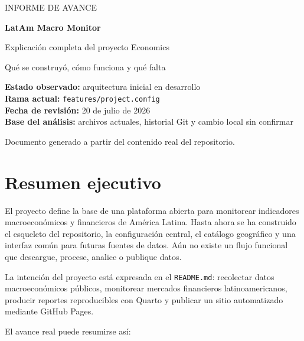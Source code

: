 \documentclass[11pt,a4paper]{article}
\newcommand{\code}[1]{\texttt{#1}}
\begin{document}
\begin{titlepage}
\pagecolor{navy}
\color{white}
\vspace*{2.2cm}
{\Large INFORME DE AVANCE\par}
\vspace{0.5cm}
{\fontsize{30}{36}\selectfont\bfseries LatAm Macro Monitor\par}
\vspace{0.4cm}
{\Large Explicación completa del proyecto Economics\par}
\vspace{1.4cm}
\color{white!85}
{\large Qué se construyó, cómo funciona y qué falta\par}
\vfill
\begin{tcolorbox}[colback=white,colframe=white!35,coltext=navy,boxrule=0.5pt,arc=2mm]
\textbf{Estado observado:} arquitectura inicial en desarrollo\\
\textbf{Rama actual:} \code{features/project.config}\\
\textbf{Fecha de revisión:} 20 de julio de 2026\\
\textbf{Base del análisis:} archivos actuales, historial Git y cambio local sin confirmar
\end{tcolorbox}
\vspace{1cm}
{\small Documento generado a partir del contenido real del repositorio.}
\end{titlepage}
\nopagecolor
\color{black}

\section{Resumen ejecutivo}

\begin{summarybox}
El proyecto define la base de una plataforma abierta para monitorear indicadores macroeconómicos y financieros de América Latina. Hasta ahora se ha construido el esqueleto del repositorio, la configuración central, el catálogo geográfico y una interfaz común para futuras fuentes de datos. Aún no existe un flujo funcional que descargue, procese, analice o publique datos.
\end{summarybox}

La intención del proyecto está expresada en el \code{README.md}: recolectar datos macroeconómicos públicos, monitorear mercados financieros latinoamericanos, producir reportes reproducibles con Quarto y publicar un sitio automatizado mediante GitHub Pages.

El avance real puede resumirse así:
\end{document}
